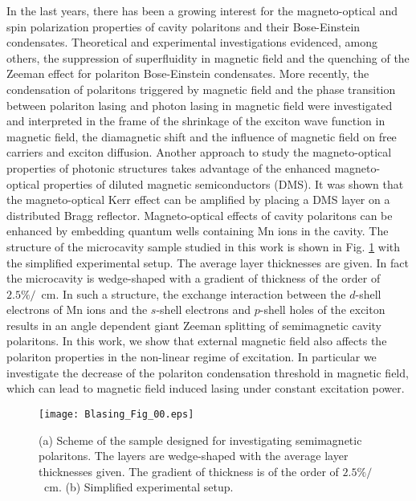 \documentclass[amssymb,prb,twocolumn,floats,amsmath]{revtex4}
\begin{document}
In the last years, there has been a growing interest for the magneto-optical and spin polarization properties of cavity polaritons and their Bose-Einstein condensates. Theoretical and experimental investigations evidenced, among others, the suppression of superfluidity in magnetic field  and the quenching of the Zeeman effect for polariton Bose-Einstein condensates. \cite{Rubo_PLA2006, Kulakovskii_PRB2012, Fisher_PRL2014} More recently, the condensation of polaritons triggered by magnetic field and the phase transition between polariton lasing and photon lasing in magnetic field were investigated and interpreted in the frame of the shrinkage of the exciton wave function in magnetic field, the diamagnetic shift and the influence of magnetic field on free carriers and exciton diffusion. \cite{Kochereshko_SciRep2016,Kochereshko_Semiconductors2016} Another approach to study the magneto-optical properties of photonic structures takes advantage of the enhanced magneto-optical properties of diluted magnetic semiconductors (DMS). It was shown that the magneto-optical Kerr effect can be amplified by placing a DMS layer on a distributed Bragg reflector. \cite{Cubian_PRB_2003,Sadowski_PRB_1997,Haddad_SSC_1999,Koba_JEWA2013, Koba_EPL2014, Pacuski_CDG2017} Magneto-optical effects of cavity polaritons can be enhanced by embedding quantum wells containing Mn ions in the cavity.\cite{UlmerTuffigo_JCG_1996,Ulmer_SLM97, Brunetti_PSSC_2005, Brunetti_PRB2006,Brunetti_PRB2006_spin_dynamics,Rousset_JCG2013, Rousset_JCG2014, Rousset_APL2015} The structure of the microcavity sample studied in this work is shown in Fig. \ref{setup} with the simplified experimental setup. The average layer thicknesses are given. In fact the microcavity is wedge-shaped with a gradient of thickness of the order of $2.5\%/$~cm. In such a structure, the exchange interaction between the $d$-shell electrons of Mn ions and the $s$-shell electrons and $p$-shell holes of the exciton results in an angle dependent giant Zeeman splitting of semimagnetic cavity polaritons. \cite{Mirek_PRB2017} In this work, we show that external magnetic field also affects the polariton properties in the non-linear regime of excitation. In particular we investigate the decrease of the polariton condensation threshold in magnetic field, which can lead to magnetic field induced lasing under constant excitation power.

\begin{figure}
    \texttt{[image: Blasing\_Fig\_00.eps]}
  \caption{(a) Scheme of the sample designed for investigating semimagnetic polaritons. The layers are wedge-shaped with the average layer thicknesses given. The gradient of thickness is of the order of $2.5\%/$~cm. (b) Simplified experimental setup.}
  \label{setup}
\end{figure}
\end{document}
